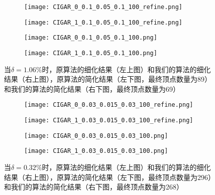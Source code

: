 \begin{figure}[H]
  \centering
  \begin{subfigure}[b]{0.4\textwidth}
    \texttt{[image: CIGAR\_0\_0.1\_0.05\_0.1\_100\_refine.png]}
  \end{subfigure}
  \begin{subfigure}[b]{0.4\textwidth}
    \texttt{[image: CIGAR\_1\_0.1\_0.05\_0.1\_100\_refine.png]}
  \end{subfigure}
  \begin{subfigure}[b]{0.4\textwidth}
    \texttt{[image: CIGAR\_0\_0.1\_0.05\_0.1\_100.png]}
  \end{subfigure}
  \begin{subfigure}[b]{0.4\textwidth}
    \texttt{[image: CIGAR\_1\_0.1\_0.05\_0.1\_100.png]}
  \end{subfigure}
  \caption[当$\delta=1.06\%$时cigar结果对比]{当$\delta=1.06\%$时，原算法的细化结果（左上图）和我们的算法的细化结果（右上图），原算法的简化结果（左下图，最终顶点数量为89）和我们的算法的简化结果（右下图，最终顶点数量为69）}
  \label{fig:cigar-res1}
\end{figure}

\begin{figure}[H]
  \centering
  \begin{subfigure}[b]{0.4\textwidth}
    \texttt{[image: CIGAR\_0\_0.03\_0.015\_0.03\_100\_refine.png]}
  \end{subfigure}
  \begin{subfigure}[b]{0.4\textwidth}
    \texttt{[image: CIGAR\_1\_0.03\_0.015\_0.03\_100\_refine.png]}
  \end{subfigure}
  \begin{subfigure}[b]{0.4\textwidth}
    \texttt{[image: CIGAR\_0\_0.03\_0.015\_0.03\_100.png]}
  \end{subfigure}
  \begin{subfigure}[b]{0.4\textwidth}
    \texttt{[image: CIGAR\_1\_0.03\_0.015\_0.03\_100.png]}
  \end{subfigure}
  \caption[当$\delta=0.32\%$时cigar结果对比]{当$\delta=0.32\%$时，原算法的细化结果（左上图）和我们的算法的细化结果（右上图），原算法的简化结果（左下图，最终顶点数量为296）和我们的算法的简化结果（右下图，最终顶点数量为268）}
  \label{fig:cigar-res2}
\end{figure}

